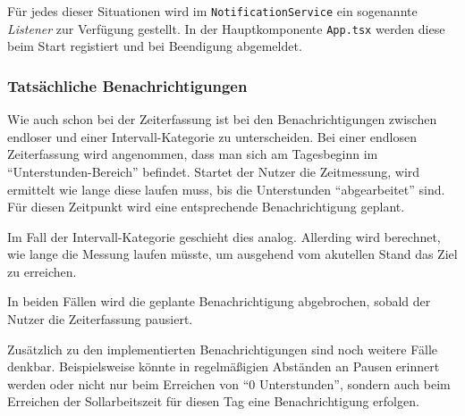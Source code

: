 \noindent
Für jedes dieser Situationen wird im \texttt{NotificationService} ein sogenannte \emph{Listener} zur Verfügung gestellt.
In der Hauptkomponente \texttt{App.tsx} werden diese beim Start registiert und bei Beendigung abgemeldet.

\subsubsection{Tatsächliche Benachrichtigungen}
Wie auch schon bei der Zeiterfassung ist bei den Benachrichtigungen zwischen endloser und einer Intervall-Kategorie zu unterscheiden.
Bei einer endlosen Zeiterfassung wird angenommen,
dass man sich am Tagesbeginn im \enquote{Unterstunden-Bereich} befindet.
Startet der Nutzer die Zeitmessung, wird ermittelt wie lange diese laufen muss,
bis die Unterstunden \enquote{abgearbeitet} sind.
Für diesen Zeitpunkt wird eine entsprechende Benachrichtigung geplant.

Im Fall der Intervall-Kategorie geschieht dies analog.
Allerding wird berechnet, wie lange die Messung laufen müsste,
um ausgehend vom akutellen Stand das Ziel zu erreichen.

In beiden Fällen wird die geplante Benachrichtigung abgebrochen,
sobald der Nutzer die Zeiterfassung pausiert.

Zusätzlich zu den implementierten Benachrichtigungen sind noch weitere Fälle denkbar.
Beispielsweise könnte in regelmäßigien Abständen an Pausen erinnert werden
oder nicht nur beim Erreichen von \enquote{0 Unterstunden},
sondern auch beim Erreichen der Sollarbeitszeit für diesen Tag eine Benachrichtigung erfolgen.